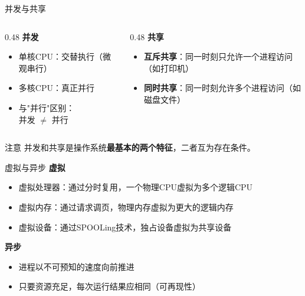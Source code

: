 \documentclass[10pt, aspectratio=169]{beamer}
\begin{document}
\begin{frame}{并发与共享}
    \begin{columns}
        \begin{column}{0.48\textwidth}
            \textbf{并发}
            \begin{itemize}
                \item 单核CPU：交替执行（微观串行）
                \item 多核CPU：真正并行
                \item 与"并行"区别：\\
                      并发 $\neq$ 并行
            \end{itemize}
        \end{column}
        \begin{column}{0.48\textwidth}
            \textbf{共享}
            \begin{itemize}
                \item \textbf{互斥共享}：同一时刻只允许一个进程访问（如打印机）
                \item \textbf{同时共享}：同一时刻允许多个进程访问（如磁盘文件）
            \end{itemize}
        \end{column}
    \end{columns}
    \vspace{0.5em}
    \begin{alertblock}{注意}
        并发和共享是操作系统\textbf{最基本的两个特征}，二者互为存在条件。
    \end{alertblock}
\end{frame}

\begin{frame}{虚拟与异步}
    \textbf{虚拟}
    \begin{itemize}
        \item 虚拟处理器：通过分时复用，一个物理CPU虚拟为多个逻辑CPU
        \item 虚拟内存：通过请求调页，物理内存虚拟为更大的逻辑内存
        \item 虚拟设备：通过SPOOLing技术，独占设备虚拟为共享设备
    \end{itemize}
    \vspace{0.5em}
    \textbf{异步}
    \begin{itemize}
        \item 进程以不可预知的速度向前推进
        \item 只要资源充足，每次运行结果应相同（可再现性）
    \end{itemize}
\end{frame}
\end{document}

